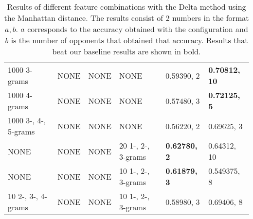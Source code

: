 \begin{landscape}
\begin{table}
\begin{tabular}{llll|ll}
        1000 3-grams & NONE & NONE & NONE & 0.59390, 2 & \textbf{0.70812, 10} \\
        1000 4-grams & NONE & NONE & NONE & 0.57480, 3 & \textbf{0.72125, 5} \\
        1000 3-, 4-, 5-grams & NONE & NONE & NONE & 0.56220, 2 & 0.69625, 3 \\
        NONE & NONE & NONE & 20 1-, 2-, 3-grams & \textbf{0.62780, 2} &
        0.64312, 10 \\
        NONE & NONE & NONE & 10 1-, 2-, 3-grams & \textbf{0.61879, 3} &
        0.549375, 8 \\
        10 2-, 3-, 4-grams & NONE & NONE & 10 1-, 2-, 3-grams & 0.58980, 3 &
        0.69406, 8
    \end{tabular}
    \caption{Results of different feature combinations with the Delta method
    using the Manhattan distance. The results consist of 2 numbers in the format
    $a, b$. $a$ corresponds to the accuracy obtained with the configuration and
    $b$ is the number of opponents that obtained that accuracy. Results that
    beat our baseline results are shown in bold.}
    \label{fig:extended_delta_method_manhattan_result}
\end{table}
\end{landscape}


